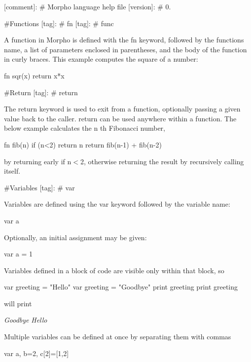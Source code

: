 \mbox{[}comment\mbox{]}\+: \# Morpho language help file \mbox{[}version\mbox{]}\+: \# 0.

\#\+Functions \mbox{[}tag\mbox{]}\+: \# fn \mbox{[}tag\mbox{]}\+: \# func

A function in Morpho is defined with the {\ttfamily fn} keyword, followed by the function\textquotesingle{}s name, a list of parameters enclosed in parentheses, and the body of the function in curly braces. This example computes the square of a number\+: \begin{DoxyVerb}fn sqr(x) {
  return x*x    
}
\end{DoxyVerb}


\#\+Return \mbox{[}tag\mbox{]}\+: \# return

The {\ttfamily return} keyword is used to exit from a function, optionally passing a given value back to the caller. {\ttfamily return} can be used anywhere within a function. The below example calculates the {\ttfamily n} th Fibonacci number, \begin{DoxyVerb}fn fib(n) {
  if (n<2) return n 
  return fib(n-1) + fib(n-2) 
}
\end{DoxyVerb}


by returning early if {\ttfamily n$<$2}, otherwise returning the result by recursively calling itself.

\#\+Variables \mbox{[}tag\mbox{]}\+: \# var

Variables are defined using the {\ttfamily var} keyword followed by the variable name\+: \begin{DoxyVerb}var a
\end{DoxyVerb}


Optionally, an initial assignment may be given\+: \begin{DoxyVerb}var a = 1
\end{DoxyVerb}


Variables defined in a block of code are visible only within that block, so \begin{DoxyVerb}var greeting = "Hello" 
{
    var greeting = "Goodbye" 
    print greeting 
}
print greeting 
\end{DoxyVerb}


will print

{\itshape Goodbye} {\itshape Hello}

Multiple variables can be defined at once by separating them with commas \begin{DoxyVerb}var a, b=2, c[2]=[1,2]
\end{DoxyVerb}



